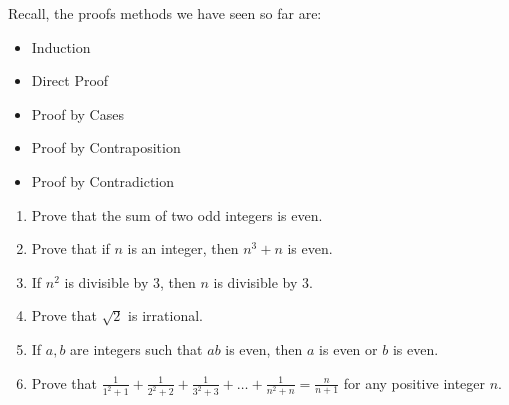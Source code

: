 \documentclass[fleqn]{article}
\newcommand{\ds}{\displaystyle}
\theoremstyle{definition}
\begin{document}
Recall, the proofs methods we have seen so far are:
    \begin{itemize}
        \item Induction
        \item Direct Proof
        \item Proof by Cases
        \item Proof by Contraposition
        \item Proof by Contradiction 
    \end{itemize}

\vspace{.5cm}
\begin{enumerate}
\item Prove that the sum of two odd integers is even. 

\vspace{6cm}
\item Prove that if $n$ is an integer, then $n^3+n$ is even. 



\newpage 


\item If $n^2$ is divisible by $3$, then $n$ is divisible by $3$. 

\vfill


\item Prove that $\sqrt{2}$ is irrational. 


\vfill


\item If $a, b$ are integers such that $ab$ is even, then $a$ is even or $b$ is even. 


\vfill


\newpage 


\item Prove that $\ds{ \frac{1}{1^2+1} + \frac{1}{2^2+2} + \frac{1}{3^2+3} + \ldots + \frac{1}{n^2+n} = \frac{n}{n+1} }$ for any positive integer $n$.

\vspace{6cm} 


\end{enumerate}
\end{document}
